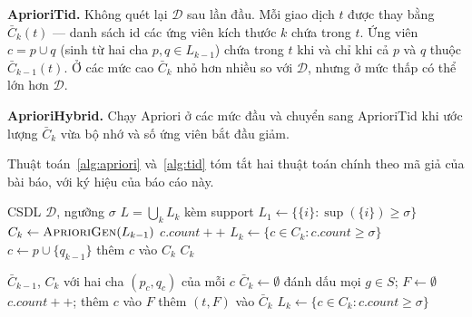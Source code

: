 \documentclass[10pt,twocolumn,letterpaper]{article}
\renewcommand{\sup}{\operatorname{sup}}
\newcommand{\D}{\mathcal{D}}
\begin{document}
\textbf{AprioriTid.} Không quét lại $\D$ sau lần đầu. Mỗi giao dịch $t$ được thay bằng $\bar{C}_k(t)$ — danh sách id các ứng viên kích thước $k$ chứa trong $t$. Ứng viên $c=p\cup q$ (sinh từ hai cha $p,q\in L_{k-1}$) chứa trong $t$ khi và chỉ khi cả $p$ và $q$ thuộc $\bar{C}_{k-1}(t)$. Ở các mức cao $\bar{C}_k$ nhỏ hơn nhiều so với $\D$, nhưng ở mức thấp có thể lớn hơn $\D$.

\textbf{AprioriHybrid.} Chạy Apriori ở các mức đầu và chuyển sang AprioriTid khi ước lượng $\bar{C}_k$ vừa bộ nhớ và số ứng viên bắt đầu giảm.

Thuật toán~\ref{alg:apriori} và~\ref{alg:tid} tóm tắt hai thuật toán chính theo mã giả của bài báo, với ký hiệu của báo cáo này.

\begin{algorithm}[t]
\caption{Apriori và \texttt{apriori-gen}}
\label{alg:apriori}
\footnotesize
\begin{algorithmic}[1]
\Require CSDL $\D$, ngưỡng $\sigma$
\Ensure $L=\bigcup_k L_k$ kèm support
\State $L_1\gets\{\{i\}: \sup(\{i\})\ge\sigma\}$ 
  \State $C_k\gets\textsc{AprioriGen}(L_{k-1})$
  \ForAll{$t\in\D$}
     \State $c.\mathit{count}{+}{+}$ \EndFor
  \EndFor
  \State $L_k\gets\{c\in C_k : c.\mathit{count}\ge\sigma\}$
\EndFor
\Statex
{} 
    \State $c\gets p\cup\{q_{k-1}\}$ 
     
      \State thêm $c$ vào $C_k$
    \EndIf
  \EndFor
  \State \Return $C_k$
\EndFunction
\end{algorithmic}
\end{algorithm}

\begin{algorithm}[t]
\caption{AprioriTid (bước đếm mức $k\ge2$)}
\label{alg:tid}
\footnotesize
\begin{algorithmic}[1]
\Require $\bar{C}_{k-1}$, $C_k$ với hai cha $(p_c,q_c)$ của mỗi $c$
\State $\bar{C}_k\gets\emptyset$
 
  \State đánh dấu mọi $g\in S$; $F\gets\emptyset$
     \State $c.\mathit{count}{+}{+}$; thêm $c$ vào $F$ \EndIf
  \EndFor
   thêm $(t,F)$ vào $\bar{C}_k$ \EndIf
\EndFor
\State $L_k\gets\{c\in C_k : c.\mathit{count}\ge\sigma\}$
\end{algorithmic}
\end{algorithm}
\end{document}
